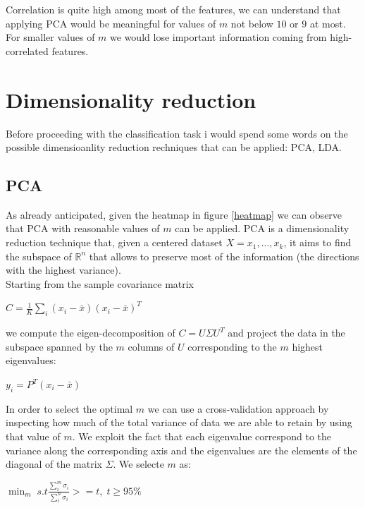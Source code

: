 \documentclass[10pt, a4paper, twocolumn]{article} %
\begin{document}
Correlation is quite high among most of the features, we can understand that applying PCA
would be meaningful for values of $m$ not below $10$ or $9$ at most. For smaller values of $m$
we would lose important information coming from high-correlated features. 

\section{Dimensionality reduction}
Before proceeding with the classification task i would spend some words on the possible 
dimensioanlity reduction rechniques that can be applied: PCA, LDA.
\subsection{PCA}
As already anticipated, given the heatmap in figure \ref{heatmap} we can observe that PCA
with reasonable values of $m$ can be applied. PCA is a dimensionality reduction technique
that, given a centered dataset $X = {x_{1}, ..., x_{k}}$, it aims to find the subspace of 
$\mathbb{R}^{n}$ that allows to preserve most of the information (the directions with the
highest variance).\\Starting from the sample covariance matrix
\begin{center}
	\begin{math}
		C = \frac{1}{K} \sum_{i}^{}(x_{i} - \bar{x})(x_{i}-\bar{x})^T
	\end{math}
\end{center}
we compute the eigen-decomposition of $C = U\Sigma U^T$ and project the data in the subspace
spanned by the $m$ columns of $U$ corresponding to the $m$ highest eigenvalues:
\begin{center}
	\begin{math}
		y_{i} = P^T(x_{i}-\bar{x})
	\end{math}
\end{center}
In order to select the optimal $m$ we can use a cross-validation approach by inspecting how much
of the total variance of data we are able to retain by using that value of $m$. We exploit the fact
that each eigenvalue correspond to the variance along the corresponding axis and the
eigenvalues are the elements of the diagonal of the matrix $\Sigma$. We selecte $m$ as:
\begin{center}
	\begin{math}
		\min_m\;s.t \frac{\sum_{i}^{m}\sigma_{i}}{\sum_{i}^{n}\sigma_{i}} >= t,\;t \ge 95\%
	\end{math}
\end{center}
\end{document}
